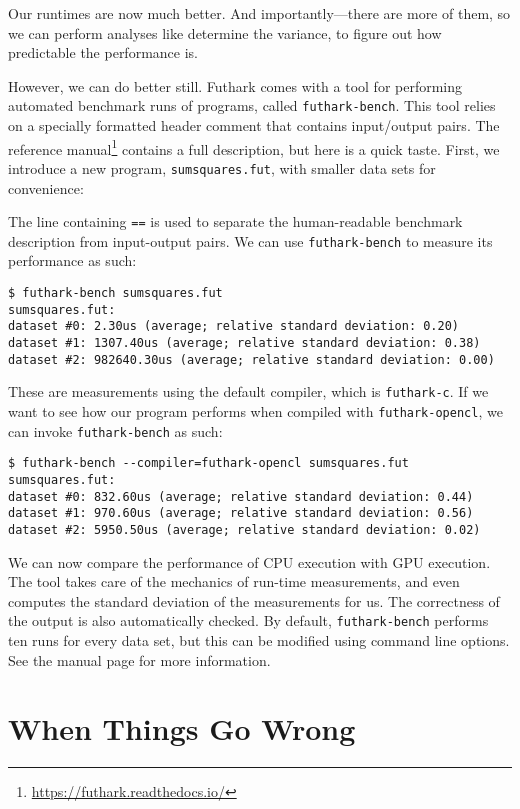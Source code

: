 \documentclass[oneside,11pt]{book}
\newenvironment{wrap}{\vspace{\topskip}\par\noindent\begin{minipage}{\linewidth}}{\end{minipage}\par}
\newcommand{\inplisting}[1]{\begin{wrap}\end{wrap}}
\begin{document}
Our runtimes are now much better.  And importantly---there are
more of them, so we can perform analyses like determine the variance,
to figure out how predictable the performance is.

However, we can do better still.  Futhark comes with a tool for
performing automated benchmark runs of programs, called
\texttt{futhark-bench}.  This tool relies on a specially formatted
header comment that contains input/output pairs.  The reference
manual\footnote{\url{https://futhark.readthedocs.io/}} contains a full
description, but here is a quick taste.  First, we introduce a new
program, \texttt{sumsquares.fut}, with smaller data sets for
convenience:

\inplisting{src/sumsquares.fut}

The line containing \texttt{==} is used to separate the human-readable
benchmark description from input-output pairs.  We can use
\texttt{futhark-bench} to measure its performance as such:

\begin{verbatim}
$ futhark-bench sumsquares.fut
sumsquares.fut:
dataset #0: 2.30us (average; relative standard deviation: 0.20)
dataset #1: 1307.40us (average; relative standard deviation: 0.38)
dataset #2: 982640.30us (average; relative standard deviation: 0.00)
\end{verbatim}

These are measurements using the default compiler, which is
\texttt{futhark-c}.  If we want to see how our program performs when
compiled with \texttt{futhark-opencl}, we can invoke
\texttt{futhark-bench} as such:

\begin{verbatim}
$ futhark-bench --compiler=futhark-opencl sumsquares.fut
sumsquares.fut:
dataset #0: 832.60us (average; relative standard deviation: 0.44)
dataset #1: 970.60us (average; relative standard deviation: 0.56)
dataset #2: 5950.50us (average; relative standard deviation: 0.02)
\end{verbatim}

We can now compare the performance of CPU execution with GPU
execution.  The tool takes care of the mechanics of run-time
measurements, and even computes the standard deviation of the
measurements for us.  The correctness of the output is also
automatically checked.  By default, \texttt{futhark-bench} performs
ten runs for every data set, but this can be modified using command
line options.  See the manual page for more information.

\section{When Things Go Wrong}
\end{document}
